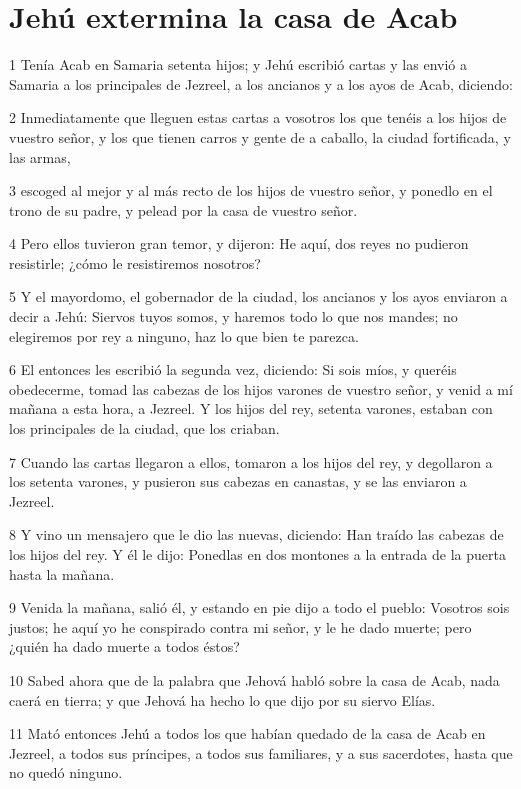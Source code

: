 \section*{Jehú extermina la casa de Acab}

\par 1 Tenía Acab en Samaria setenta hijos; y Jehú escribió cartas y las envió a Samaria a los principales de Jezreel, a los ancianos y a los ayos de Acab, diciendo:
\par 2 Inmediatamente que lleguen estas cartas a vosotros los que tenéis a los hijos de vuestro señor, y los que tienen carros y gente de a caballo, la ciudad fortificada, y las armas,
\par 3 escoged al mejor y al más recto de los hijos de vuestro señor, y ponedlo en el trono de su padre, y pelead por la casa de vuestro señor.
\par 4 Pero ellos tuvieron gran temor, y dijeron: He aquí, dos reyes no pudieron resistirle; ¿cómo le resistiremos nosotros?
\par 5 Y el mayordomo, el gobernador de la ciudad, los ancianos y los ayos enviaron a decir a Jehú: Siervos tuyos somos, y haremos todo lo que nos mandes; no elegiremos por rey a ninguno, haz lo que bien te parezca.
\par 6 El entonces les escribió la segunda vez, diciendo: Si sois míos, y queréis obedecerme, tomad las cabezas de los hijos varones de vuestro señor, y venid a mí mañana a esta hora, a Jezreel. Y los hijos del rey, setenta varones, estaban con los principales de la ciudad, que los criaban.
\par 7 Cuando las cartas llegaron a ellos, tomaron a los hijos del rey, y degollaron a los setenta varones, y pusieron sus cabezas en canastas, y se las enviaron a Jezreel.
\par 8 Y vino un mensajero que le dio las nuevas, diciendo: Han traído las cabezas de los hijos del rey. Y él le dijo: Ponedlas en dos montones a la entrada de la puerta hasta la mañana.
\par 9 Venida la mañana, salió él, y estando en pie dijo a todo el pueblo: Vosotros sois justos; he aquí yo he conspirado contra mi señor, y le he dado muerte; pero ¿quién ha dado muerte a todos éstos?
\par 10 Sabed ahora que de la palabra que Jehová habló sobre la casa de Acab, nada caerá en tierra; y que Jehová ha hecho lo que dijo por su siervo Elías.
\par 11 Mató entonces Jehú a todos los que habían quedado de la casa de Acab en Jezreel, a todos sus príncipes, a todos sus familiares, y a sus sacerdotes, hasta que no quedó ninguno.
